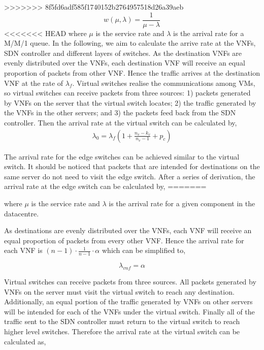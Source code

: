 >>>>>>> 8f5fd6adf585f1740152b2764957518d26a39aeb
\begin{equation}
\label{eq:p_latency}
w(\mu, \lambda) = \frac{1}{\mu - \lambda}
\end{equation}
<<<<<<< HEAD
where $\mu$ is the service rate and $\lambda$ is the arrival rate for a M/M/1 queue.  In the following, we aim to calculate the arrive rate at the VNFs, SDN controller and different layers of switches. As the destination VNFs are evenly distributed over the VNFs, each destination VNF will receive an equal proportion of packets from other VNF. Hence the traffic arrives at the destination VNF at the rate of $\lambda_f$. Virtual switches realise the communications among VMs, so virtual switches can receive packets from three sources: 1) packets generated by VNFs on the server that the virtual switch locates; 2) the traffic generated by the VNFs in the other servers; and 3) the packets feed back from the SDN controller. Then the arrival rate at the virtual switch can be calculated by,
\begin{equation}
\label{eq:arr_srv}
\begin{split}
\lambda _{ 0 }={ \lambda  }_{ f }(1+\frac { n_v-k_{ v } }{ n_v-1 } +p_{ c })
\end{split}
\end{equation}

The arrival rate for the edge switches can be achieved similar to the virtual switch. It should be noticed that packets that are intended for destinations on the same server do not need to visit the edge switch. After a series of derivation, the arrival rate at the edge switch can be calculated by,
=======

\noindent where $\mu$ is the service rate and $\lambda$ is the arrival rate for a given component in the datacentre.

As destinations are evenly distributed over the VNFs, each VNF will receive an equal proportion of packets from every other VNF. Hence the arrival rate for each VNF is $(n - 1) \cdot \frac{1}{n - 1} \cdot \alpha$ which can be simplified to, 

\begin{equation}
\label{eq:arr_vnf}
\lambda_{vnf} = \alpha
\end{equation}

Virtual switches can receive packets from three sources. All packets generated by VNFs on the server must visit the virtual switch to reach any destination. Additionally, an equal portion of the traffic generated by VNFs on other servers will be intended for each of the VNFs under the virtual switch. Finally all of the traffic sent to the SDN controller must return to the virtual switch to reach higher level switches. Therefore the arrival rate at the virtual switch can be calculated as,

